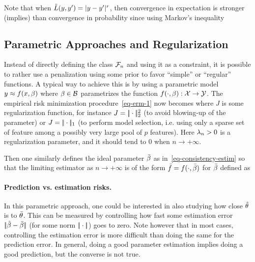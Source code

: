 Note that when $\tilde{L}(y,y')=|y-y'|^r$, then convergence in expectation is stronger (implies) than convergence in probability since using Markov's inequality

\subsection{Parametric Approaches and Regularization}

Instead of directly defining the class $\mathcal{F}_n$ and using it as a constraint, it is possible to rather use a penalization using some prior to favor ``simple'' or ``regular'' functions. 
%
A typical way to achieve this is by using a parametric model $y \approx f(x,\beta)$ where $\beta \in \mathcal{B}$ parametrizes the function $f(\cdot,\beta) : \mathcal{X} \rightarrow \mathcal{Y}$. The empirical risk minimization procedure~\eqref{eq-erm-1} now becomes 
where $J$ is some regularization function, for instance $J=|\!| \cdot |\!|_2^2$ (to avoid blowing-up of the parameter) or $J=|\!| \cdot |\!|_1$ (to perform model selection, i.e. using only a sparse set of feature among a possibly very large pool of $p$ features). Here $\lambda_n>0$ is a regularization parameter, and it should tend to $0$ when $n \rightarrow +\infty$. 

Then one similarly defines the ideal parameter $\bar {\beta}$ as in~\eqref{eq-consistency-estim} so that the limiting estimator as $n \rightarrow +\infty$ is of the form $\bar f = f(\cdot,\bar {\beta})$ for $\bar {\beta}$ defined as



\paragraph{Prediction vs. estimation risks.}

In this parametric approach, one could be interested in also studying how close $\hat {\theta}$ is to $\bar {\theta}$. This can be measured by controlling how fast some estimation error $|\!| \hat{\beta}-\bar{\beta} |\!|$ (for some norm $|\!| \cdot |\!|$) goes to zero. Note however that in most cases, controlling the estimation error is more difficult than doing the same for the prediction error. In general, doing a good parameter estimation implies doing a good prediction, but the converse is not true. 


